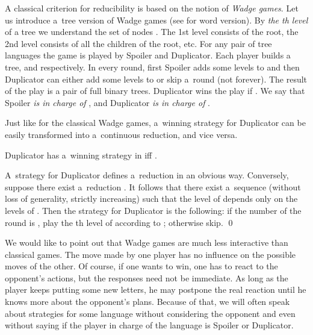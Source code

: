 \documentclass{LMCS}
\begin{document}
A classical criterion for reducibility is based on the notion of {\em Wadge games}. Let us introduce a~tree version of Wadge games (see \cite{perrin} for word version). By  {\em the th level} of a tree we understand the set of nodes . The 1st level consists of the root, the 2nd level consists of all the children of the root, etc. For any pair of tree languages  the game  is played by Spoiler and Duplicator. Each player builds a tree,  and  respectively. In every round, first Spoiler adds some levels to  and then Duplicator can either add some levels to  or skip a~round (not forever). The result of the play is a pair of full binary trees. Duplicator wins the play if . We say that Spoiler {\em is in charge of } , and Duplicator {\em is in charge of} . 

Just like for the classical Wadge games, a~winning strategy for Duplicator can be easily transformed into a~continuous reduction, and vice versa. 

\begin{lem} \label{wadgegame}
Duplicator has a~winning strategy in  iff . 
\end{lem}

\proof A~strategy for Duplicator defines a~reduction in an obvious
way. Conversely, suppose there exist a~reduction . It follows that there exist a~sequence  (without
loss of generality, strictly increasing) such that the level  of
 depends only on the levels  of
. Then the strategy for Duplicator is the following: if the number
of the round is , play the th level of  according to
; otherwise skip. \qed

\vspace{5pt}

We would like to point out that Wadge games are much less interactive
than classical games. The move made by one player has no influence on
the possible moves of the other. Of course, if one wants to win, one
has to react to the opponent's actions, but the responses need not be
immediate. As long as the player keeps putting some new letters, he
may postpone the real reaction until he knows more about the
opponent's plans. Because of that, we will often speak about
strategies for some language without considering the opponent and even
without saying if the player in charge of the language is Spoiler or
Duplicator.
\end{document}
